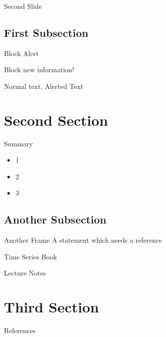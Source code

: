 \documentclass[aspectratio=169]{beamer}
\begin{document}
\begin{frame}{Second Slide}
    
\end{frame}

\subsection{First Subsection}
\begin{frame}{Block Alert}
    \begin{block}{Block}
        new information!
    \end{block}

    \vfill

    Normal text, \alert{Alerted Text}

\end{frame}

\section{Second Section}
\begin{frame}{Summary}
    \begin{itemize}
        \item 1
        \item 2
        \item 3
    \end{itemize}
\end{frame}

\subsection{Another Subsection}
\begin{frame}{Another Frame}
    A statement which needs a reference \cite{origin}

    Time Series Book \cite{hyndman}

    Lecture Notes \cite{MATH334}
\end{frame}

\section{Third Section}

\begin{frame}{References}
    
    
\end{frame}
\end{document}
